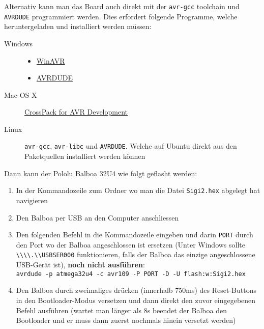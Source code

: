 \documentclass[a4paper]{article}
\begin{document}
Alternativ kann man das Board auch direkt mit der \verb|avr-gcc| toolchain und \verb|AVRDUDE| programmiert werden. Dies erfordert folgende Programme, welche heruntergeladen und installiert werden müssen:
\begin{description}
	\item[Windows] \begin{itemize}
		\item \hyperref{http://winavr.sourceforge.net/}{}{}{WinAVR}
		\item \hyperref{http://www.nongnu.org/avrdude/}{}{}{AVRDUDE}
	\end{itemize}
	\item[Mac OS X] \hyperref{http://www.obdev.at/products/crosspack}{}{}{CrossPack for AVR Development}
	\item[Linux] \verb|avr-gcc|, \verb|avr-libc| und \verb|AVRDUDE|. Welche auf Ubuntu direkt aus den Paketquellen installiert werden können
\end{description}
Dann kann der Pololu Balboa 32U4 wie folgt geflasht werden:
\begin{enumerate}
	\item In der Kommandozeile zum Ordner wo man die Datei \verb|Sigi2.hex| abgelegt hat navigieren
	\item Den Balboa per USB an den Computer anschliessen
	\item Den folgenden Befehl in die Kommandozeile eingeben und darin \verb|PORT| durch den Port wo der Balboa angeschlossen ist ersetzen (Unter Windows sollte \verb| \\\\.\\USBSER000| funktionieren, falls der Balboa das einzige angeschlossene USB-Gerät ist), \textbf{noch nicht ausführen}:\\
	\verb|avrdude -p atmega32u4 -c avr109 -P PORT -D -U flash:w:Sigi2.hex|
	\item Den Balboa durch zweimaliges drücken (innerhalb 750ms) des Reset-Buttons in den Bootloader-Modus versetzen und dann direkt den zuvor eingegebenen Befehl ausführen (wartet man länger als 8s beendet der Balboa den Bootloader und er muss dann zuerst nochmals hinein versetzt werden)
\end{enumerate}
\end{document}

